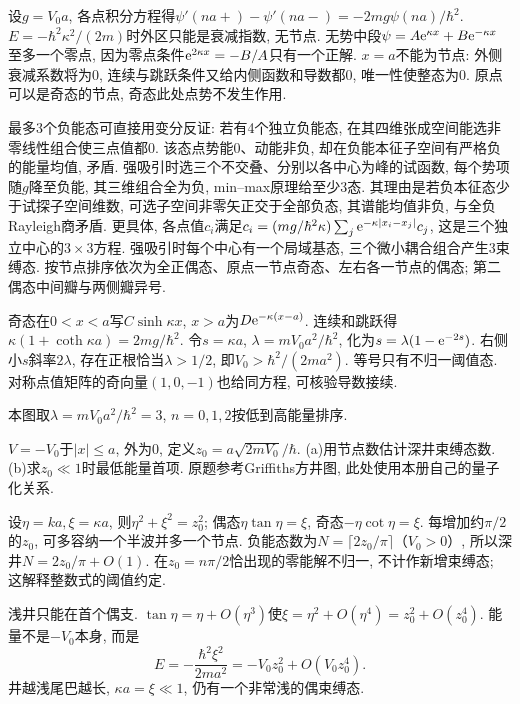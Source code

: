\begin{solution}
设$g=V_0a$, 各点积分方程得$\psi'(na+)-\psi'(na-)=-2mg\psi(na)/\hbar^2$. $E=-\hbar^2\kappa^2/(2m)$时外区只能是衰减指数, 无节点. 无势中段$\psi=A\mathrm e^{\kappa x}+B\mathrm e^{-\kappa x}$至多一个零点, 因为零点条件$\mathrm e^{2\kappa x}=-B/A$只有一个正解. $x=a$不能为节点: 外侧衰减系数将为0, 连续与跳跃条件又给内侧函数和导数都0, 唯一性使整态为0. 原点可以是奇态的节点, 奇态此处点势不发生作用.

最多3个负能态可直接用变分反证: 若有4个独立负能态, 在其四维张成空间能选非零线性组合使三点值都0. 该态点势能0、动能非负, 却在负能本征子空间有严格负的能量均值, 矛盾. 强吸引时选三个不交叠、分别以各中心为峰的试函数, 每个势项随$g$降至负能, 其三维组合全为负, min--max原理给至少3态. 其理由是若负本征态少于试探子空间维数, 可选子空间非零矢正交于全部负态, 其谱能均值非负, 与全负Rayleigh商矛盾. 更具体, 各点值$c_i$满足$c_i=(mg/\hbar^2\kappa)\sum_j\mathrm e^{-\kappa|x_i-x_j|}c_j$, 这是三个独立中心的$3\times3$方程. 强吸引时每个中心有一个局域基态, 三个微小耦合组合产生3束缚态. 按节点排序依次为全正偶态、原点一节点奇态、左右各一节点的偶态; 第二偶态中间瓣与两侧瓣异号.

奇态在$0<x<a$写$C\sinh\kappa x$, $x>a$为$D\mathrm e^{-\kappa(x-a)}$. 连续和跳跃得$\kappa(1+\coth\kappa a)=2mg/\hbar^2$. 令$s=\kappa a$, $\lambda=mV_0a^2/\hbar^2$, 化为$s=\lambda(1-\mathrm e^{-2s})$. 右侧小$s$斜率$2\lambda$, 存在正根恰当$\lambda>1/2$, 即$V_0>\hbar^2/(2ma^2)$. 等号只有不归一阈值态. 对称点值矩阵的奇向量$(1,0,-1)$也给同方程, 可核验导数接续.
\end{solution}
本图取$\lambda=mV_0a^2/\hbar^2=3$, $n=0,1,2$按低到高能量排序.

\begin{exercise}
$V=-V_0$于$|x|\le a$, 外为0, 定义$z_0=a\sqrt{2mV_0}/\hbar$. (a)用节点数估计深井束缚态数. (b)求$z_0\ll1$时最低能量首项. 原题参考Griffiths方井图, 此处使用本册自己的量子化关系.
\end{exercise}
\begin{solution}
设$\eta=ka,\xi=\kappa a$, 则$\eta^2+\xi^2=z_0^2$; 偶态$\eta\tan\eta=\xi$, 奇态$-\eta\cot\eta=\xi$. 每增加约$\pi/2$的$z_0$, 可多容纳一个半波并多一个节点. 负能态数为$N=\lceil2z_0/\pi\rceil$（$V_0>0$）, 所以深井$N=2z_0/\pi+O(1)$. 在$z_0=n\pi/2$恰出现的零能解不归一, 不计作新增束缚态; 这解释整数式的阈值约定.

浅井只能在首个偶支. $\tan\eta=\eta+O(\eta^3)$使$\xi=\eta^2+O(\eta^4)=z_0^2+O(z_0^4)$. 能量不是$-V_0$本身, 而是
\[
E=-\frac{\hbar^2\xi^2}{2ma^2}
  =-V_0z_0^2+O(V_0z_0^4).
\]
井越浅尾巴越长, $\kappa a=\xi\ll1$, 仍有一个非常浅的偶束缚态.
\end{solution}
